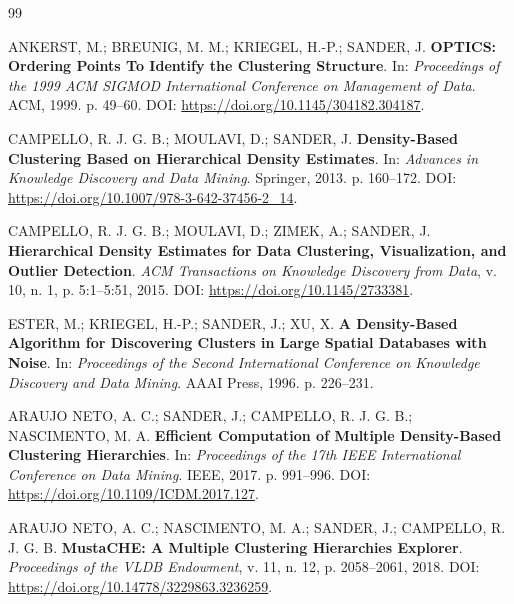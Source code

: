 \documentclass[12pt,a4paper,oneside]{article}
\begin{document}
\renewcommand{\refname}{Referências}
\begin{thebibliography}{99}

ANKERST, M.; BREUNIG, M. M.; KRIEGEL, H.-P.; SANDER, J.
\textbf{OPTICS: Ordering Points To Identify the Clustering Structure}.
In: \textit{Proceedings of the 1999 ACM SIGMOD International Conference on Management of Data}.
ACM, 1999. p. 49--60.
DOI: \url{https://doi.org/10.1145/304182.304187}.

CAMPELLO, R. J. G. B.; MOULAVI, D.; SANDER, J.
\textbf{Density-Based Clustering Based on Hierarchical Density Estimates}.
In: \textit{Advances in Knowledge Discovery and Data Mining}.
Springer, 2013. p. 160--172.
DOI: \url{https://doi.org/10.1007/978-3-642-37456-2_14}.

CAMPELLO, R. J. G. B.; MOULAVI, D.; ZIMEK, A.; SANDER, J.
\textbf{Hierarchical Density Estimates for Data Clustering, Visualization, and Outlier Detection}.
\textit{ACM Transactions on Knowledge Discovery from Data}, v. 10, n. 1,
p. 5:1--5:51, 2015.
DOI: \url{https://doi.org/10.1145/2733381}.

ESTER, M.; KRIEGEL, H.-P.; SANDER, J.; XU, X.
\textbf{A Density-Based Algorithm for Discovering Clusters in Large Spatial Databases with Noise}.
In: \textit{Proceedings of the Second International Conference on Knowledge Discovery and Data Mining}.
AAAI Press, 1996. p. 226--231.

ARAUJO NETO, A. C.; SANDER, J.; CAMPELLO, R. J. G. B.; NASCIMENTO, M. A.
\textbf{Efficient Computation of Multiple Density-Based Clustering Hierarchies}.
In: \textit{Proceedings of the 17th IEEE International Conference on Data Mining}.
IEEE, 2017. p. 991--996.
DOI: \url{https://doi.org/10.1109/ICDM.2017.127}.

ARAUJO NETO, A. C.; NASCIMENTO, M. A.; SANDER, J.; CAMPELLO, R. J. G. B.
\textbf{MustaCHE: A Multiple Clustering Hierarchies Explorer}.
\textit{Proceedings of the VLDB Endowment}, v. 11, n. 12,
p. 2058--2061, 2018.
DOI: \url{https://doi.org/10.14778/3229863.3236259}.


\end{thebibliography}
\end{document}
